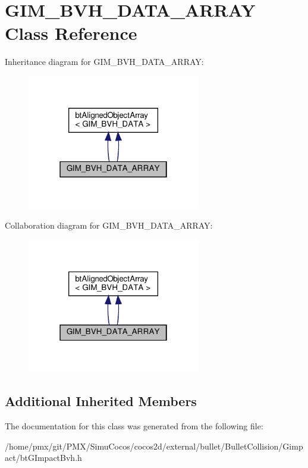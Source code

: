 \hypertarget{classGIM__BVH__DATA__ARRAY}{}\section{G\+I\+M\+\_\+\+B\+V\+H\+\_\+\+D\+A\+T\+A\+\_\+\+A\+R\+R\+AY Class Reference}
\label{classGIM__BVH__DATA__ARRAY}


Inheritance diagram for G\+I\+M\+\_\+\+B\+V\+H\+\_\+\+D\+A\+T\+A\+\_\+\+A\+R\+R\+AY\+:
\nopagebreak
\begin{figure}[H]
\begin{center}
\leavevmode
\includegraphics[width=214pt]{classGIM__BVH__DATA__ARRAY__inherit__graph}
\end{center}
\end{figure}


Collaboration diagram for G\+I\+M\+\_\+\+B\+V\+H\+\_\+\+D\+A\+T\+A\+\_\+\+A\+R\+R\+AY\+:
\nopagebreak
\begin{figure}[H]
\begin{center}
\leavevmode
\includegraphics[width=214pt]{classGIM__BVH__DATA__ARRAY__coll__graph}
\end{center}
\end{figure}
\subsection*{Additional Inherited Members}


The documentation for this class was generated from the following file\+:\begin{DoxyCompactItemize}
\item 
/home/pmx/git/\+P\+M\+X/\+Simu\+Cocos/cocos2d/external/bullet/\+Bullet\+Collision/\+Gimpact/bt\+G\+Impact\+Bvh.\+h\end{DoxyCompactItemize}
